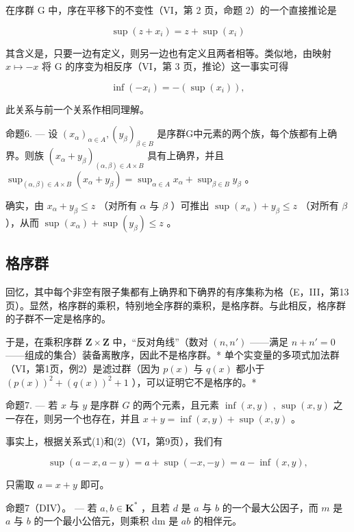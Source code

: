 在序群 G 中，序在平移下的不变性（VI，第 2 页，命题 2）的一个直接推论是

\[
\sup \left(z + x _ {i}\right) = z + \sup \left(x _ {i}\right)\tag{1}
\]

其含义是，只要一边有定义，则另一边也有定义且两者相等。类似地，由映射 \(x \mapsto -x\) 将 G 的序变为相反序（VI，第 3 页，推论）这一事实可得

\[
\inf (- x _ {i}) = - (\sup (x _ {i})),\tag{2}
\]

此关系与前一个关系作相同理解。

命题6. --- 设 \((x_{\alpha})_{\alpha \in A}, (y_{\beta})_{\beta \in B}\) 是序群G中元素的两个族，每个族都有上确界。则族 \((x_{\alpha} + y_{\beta})_{(\alpha, \beta) \in A \times B}\) 具有上确界，并且 \(\sup_{(\alpha, \beta) \in A \times B} (x_{\alpha} + y_{\beta}) = \sup_{\alpha \in A} x_{\alpha} + \sup_{\beta \in B} y_{\beta}\) 。

确实，由 \(x_{\alpha} + y_{\beta} \leqslant z\) （对所有 \(\alpha\) 与 \(\beta\) ）可推出 \(\sup (x_{\alpha}) + y_{\beta} \leqslant z\) （对所有 \(\beta\) ），从而 \(\sup (x_{\alpha}) + \sup (y_{\beta}) \leqslant z\) 。

\subsection{格序群}

回忆，其中每个非空有限子集都有上确界和下确界的有序集称为格（E，III，第13页）。显然，格序群的乘积，特别地全序群的乘积，是格序群。与此相反，格序群的子群不一定是格序的。

于是，在乘积序群 \(\mathbf{Z} \times \mathbf{Z}\) 中，“反对角线”（数对 \((n, n')\) ——满足 \(n + n' = 0\) ——组成的集合）装备离散序，因此不是格序群。* 单个实变量的多项式加法群（VI，第1页，例2）是滤过群（因为 \(p(x)\) 与 \(q(x)\) 都小于 \((p(x))^2 + (q(x))^2 + 1\) ），可以证明它不是格序的。*

命题7. --- 若 \(x\) 与 \(y\) 是序群 \(G\) 的两个元素，且元素 \(\inf(x, y)\) , \(\sup(x, y)\) 之一存在，则另一个也存在，并且 \(x + y = \inf(x, y) + \sup(x, y)\) 。

事实上，根据关系式(1)和(2)（VI，第9页），我们有

\[
\sup (a - x, a - y) = a + \sup (- x, - y) = a - \inf (x, y),
\]

只需取 \(a = x + y\) 即可。

命题7（DIV）。 --- 若 \(a, b \in \mathbf{K}^{*}\) ，且若 \(d\) 是 \(a\) 与 \(b\) 的一个最大公因子，而 \(m\) 是 \(a\) 与 \(b\) 的一个最小公倍元，则乘积 dm 是 \(ab\) 的相伴元。

